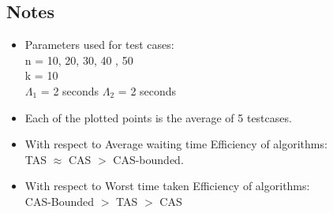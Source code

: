 \documentclass[12pt]{article}
\begin{document}
\subsection{Notes}
\begin{itemize}
\item Parameters used for test cases:\\
n = 10, 20, 30, 40 , 50\\
k = 10\\
$\Lambda _1$ = 2 seconds
$\Lambda _2$ = 2 seconds
\item Each of the plotted points is the average of 5 testcases.\\
\item With respect to Average waiting time
Efficiency of algorithms:\\
TAS $\approx$ CAS $>$ CAS-bounded.
\item With respect to Worst time taken
Efficiency of algorithms:\\
CAS-Bounded $>$ TAS $>$ CAS
\end{itemize}
\end{document}

